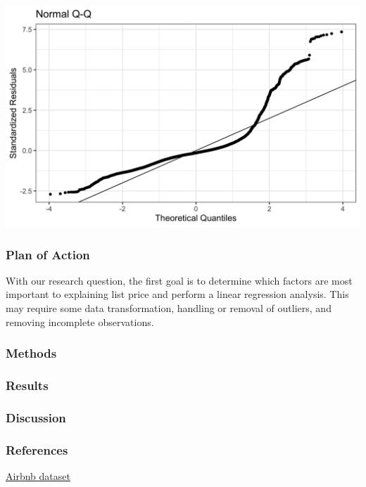 \documentclass[]{article}
\begin{document}
\includegraphics[width=7.8125in,height=\textheight]{../images/QQ_plot.png}

\hypertarget{plan-of-action}{%
\subsubsection{Plan of Action}\label{plan-of-action}}

With our research question, the first goal is to determine which factors
are most important to explaining list price and perform a linear
regression analysis. This may require some data transformation, handling
or removal of outliers, and removing incomplete observations.

\hypertarget{methods}{%
\subsubsection{Methods}\label{methods}}

\hypertarget{results}{%
\subsubsection{Results}\label{results}}

\hypertarget{discussion}{%
\subsubsection{Discussion}\label{discussion}}

\hypertarget{references}{%
\subsubsection{References}\label{references}}

\href{http://insideairbnb.com/get-the-data.html}{Airbnb dataset}
\end{document}
